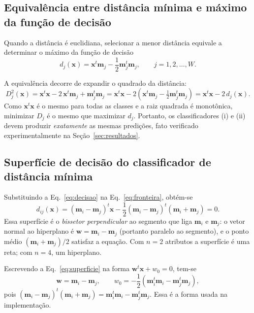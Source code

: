 \documentclass[12pt,a4paper]{article}
\begin{document}
\subsection{Equivalência entre distância mínima e máximo da função de decisão}\label{sec:equivalencia}

Quando a distância é euclidiana, selecionar a menor distância equivale a determinar o máximo da função de decisão
\begin{equation}
  d_j(\mathbf{x}) = \mathbf{x}^t \mathbf{m}_j - \frac{1}{2} \mathbf{m}_j^t \mathbf{m}_j, \qquad j = 1, 2, \dots, W.
  \label{eq:decisao}
\end{equation}

A equivalência decorre de expandir o quadrado da distância:
\begin{equation}
  D_j^2(\mathbf{x}) = \mathbf{x}^t\mathbf{x} - 2\,\mathbf{x}^t\mathbf{m}_j + \mathbf{m}_j^t\mathbf{m}_j
  = \mathbf{x}^t\mathbf{x} - 2\left(\mathbf{x}^t \mathbf{m}_j - \tfrac{1}{2}\mathbf{m}_j^t \mathbf{m}_j\right)
  = \mathbf{x}^t\mathbf{x} - 2\, d_j(\mathbf{x}).
\end{equation}
Como $\mathbf{x}^t\mathbf{x}$ é o mesmo para todas as classes e a raiz quadrada é monotônica, minimizar $D_j$ é o mesmo que maximizar $d_j$. Portanto, os classificadores (i) e (ii) devem produzir \emph{exatamente} as mesmas predições, fato verificado experimentalmente na Seção~\ref{sec:resultados}.

\subsection{Superfície de decisão do classificador de distância mínima}

Substituindo a Eq.~\eqref{eq:decisao} na Eq.~\eqref{eq:fronteira}, obtém-se
\begin{equation}
  d_{ij}(\mathbf{x}) = (\mathbf{m}_i - \mathbf{m}_j)^t \mathbf{x} - \frac{1}{2}(\mathbf{m}_i - \mathbf{m}_j)^t(\mathbf{m}_i + \mathbf{m}_j) = 0.
  \label{eq:superficie}
\end{equation}
Essa superfície é o \emph{bissetor perpendicular} ao segmento que liga $\mathbf{m}_i$ e $\mathbf{m}_j$: o vetor normal ao hiperplano é $\mathbf{w} = \mathbf{m}_i - \mathbf{m}_j$ (portanto paralelo ao segmento), e o ponto médio $(\mathbf{m}_i + \mathbf{m}_j)/2$ satisfaz a equação. Com $n=2$ atributos a superfície é uma reta; com $n=4$, um hiperplano.

Escrevendo a Eq.~\eqref{eq:superficie} na forma $\mathbf{w}^t\mathbf{x} + w_0 = 0$, tem-se
\begin{equation}
  \mathbf{w} = \mathbf{m}_i - \mathbf{m}_j, \qquad
  w_0 = -\frac{1}{2}\left(\mathbf{m}_i^t\mathbf{m}_i - \mathbf{m}_j^t\mathbf{m}_j\right),
  \label{eq:coef}
\end{equation}
pois $(\mathbf{m}_i - \mathbf{m}_j)^t(\mathbf{m}_i + \mathbf{m}_j) = \mathbf{m}_i^t\mathbf{m}_i - \mathbf{m}_j^t\mathbf{m}_j$. Essa é a forma usada na implementação.
\end{document}
